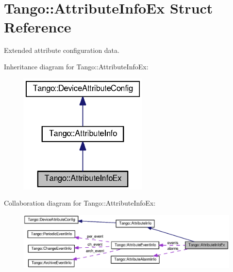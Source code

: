 \section{Tango\-:\-:Attribute\-Info\-Ex Struct Reference}
\label{structTango_1_1AttributeInfoEx}


Extended attribute configuration data.  




Inheritance diagram for Tango\-:\-:Attribute\-Info\-Ex\-:
\nopagebreak
\begin{figure}[H]
\begin{center}
\leavevmode
\includegraphics[width=184pt]{dc/d41/structTango_1_1AttributeInfoEx__inherit__graph}
\end{center}
\end{figure}


Collaboration diagram for Tango\-:\-:Attribute\-Info\-Ex\-:
\nopagebreak
\begin{figure}[H]
\begin{center}
\leavevmode
\includegraphics[width=350pt]{dc/d65/structTango_1_1AttributeInfoEx__coll__graph}
\end{center}
\end{figure}
